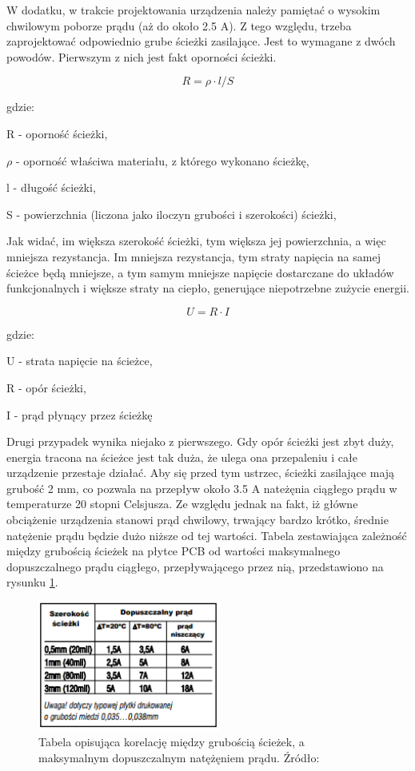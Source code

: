 W dodatku, w trakcie projektowania urządzenia należy pamiętać o wysokim chwilowym poborze prądu (aż do około 2.5 A). Z tego względu, trzeba zaprojektować odpowiednio grube ścieżki zasilające. Jest to wymagane z dwóch powodów. Pierwszym z nich jest fakt oporności ścieżki.

\begin{equation}
 R = \rho \cdot l / S 
 \label{eq_pcb_wire_resistance}
\end{equation}

gdzie:

R - oporność ścieżki,

$\rho$ - oporność właściwa materiału, z którego wykonano ścieżkę,

l - długość ścieżki,

S - powierzchnia (liczona jako iloczyn grubości i szerokości) ścieżki,

Jak widać, im większa szerokość ścieżki, tym większa jej powierzchnia, a więc mniejsza rezystancja. Im mniejsza rezystancja, tym straty napięcia na samej ścieżce będą mniejsze, a tym samym mniejsze napięcie dostarczane do układów funkcjonalnych i większe straty na ciepło, generujące niepotrzebne zużycie energii.

\begin{equation}
 U = R \cdot I
 \label{eq_voltage_drop_on_pcb_wire} 
\end{equation}

 gdzie:
 
 U - strata napięcie na ścieżce,
 
 R - opór ścieżki,
 
 I - prąd płynący przez ścieżkę
 
\clearpage
Drugi przypadek wynika niejako z pierwszego. Gdy opór ścieżki jest zbyt duży, energia tracona na ścieżce jest tak duża, że ulega ona przepaleniu i całe urządzenie przestaje działać. Aby się przed tym ustrzec, ścieżki zasilające mają grubość 2 mm, co pozwala na przepływ około 3.5 A nateżęnia ciągłego prądu w temperaturze 20 stopni Celsjusza. Ze względu jednak na fakt, iż główne obciążenie urządzenia stanowi prąd chwilowy, trwający bardzo krótko, średnie natężenie prądu będzie dużo niższe od tej wartości. Tabela zestawiająca zależność między grubością ścieżek na płytce PCB od wartości maksymalnego dopuszczalnego prądu ciągłego, przepływającego przez nią, przedstawiono na rysunku \ref{fig:image_pcb_wire_thickness}.

\begin{figure}[H]
	\centering
	\includegraphics[width=6cm]{img/board_layouts/pcb_wire_thickness.png}
	\caption{Tabela opisująca korelację między grubością ścieżek, a maksymalnym dopuszczalnym natężęniem prądu. Źródło: \cite{pcb_wire_thickness}}
	\label{fig:image_pcb_wire_thickness}
\end{figure}
 

